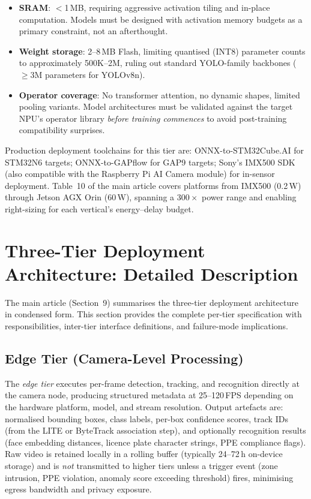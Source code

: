\documentclass[11pt,a4paper]{article}
\begin{document}
\begin{itemize}[leftmargin=*, noitemsep]
  \item \textbf{SRAM}: $<$1\,MB, requiring aggressive activation
    tiling and in-place computation. Models must be designed with
    activation memory budgets as a primary constraint, not an
    afterthought.
  \item \textbf{Weight storage}: 2--8\,MB Flash, limiting quantised
    (INT8) parameter counts to approximately 500K--2M, ruling out
    standard YOLO-family backbones ($\geq$3M parameters for YOLOv8n).
  \item \textbf{Operator coverage}: No transformer attention, no
    dynamic shapes, limited pooling variants. Model architectures
    must be validated against the target NPU's operator library
    \emph{before training commences} to avoid post-training
    compatibility surprises.
\end{itemize}

Production deployment toolchains for this tier are:
ONNX-to-STM32Cube.AI for STM32N6 targets;
ONNX-to-GAPflow for GAP9 targets;
Sony's IMX500 SDK (also compatible with the Raspberry Pi AI Camera
module) for in-sensor deployment. Table~10 of the main article
covers platforms from IMX500 (0.2\,W) through Jetson AGX Orin
(60\,W), spanning a $300{\times}$ power range and enabling
right-sizing for each vertical's energy--delay budget.

\section{Three-Tier Deployment Architecture: Detailed Description}
\label{sec:three_tier}

\noindent The main article (Section~9) summarises the three-tier
deployment architecture in condensed form. This section provides
the complete per-tier specification with responsibilities, inter-tier
interface definitions, and failure-mode implications.

\subsection{Edge Tier (Camera-Level Processing)}

The \textit{edge tier} executes per-frame detection, tracking, and
recognition directly at the camera node, producing structured metadata
at 25--120\,FPS depending on the hardware platform, model, and stream
resolution. Output artefacts are: normalised bounding boxes, class
labels, per-box confidence scores, track IDs (from the LITE or
ByteTrack association step), and optionally recognition results
(face embedding distances, licence plate character strings, PPE
compliance flags). Raw video is retained locally in a rolling buffer
(typically 24--72\,h on-device storage) and is \emph{not} transmitted
to higher tiers unless a trigger event (zone intrusion, PPE violation,
anomaly score exceeding threshold) fires, minimising egress bandwidth
and privacy exposure.
\end{document}
